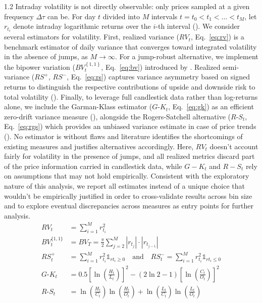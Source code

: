 \documentclass[10pt]{article}
\begin{document}
\begin{setstretch}{1.2}
Intraday volatility is not directly observable: only prices sampled at a given frequency $\Delta \tau$ can be. For day $t$ divided into $M$ intervals $t=t_0<t_1<...<t_M$, let $r_{t_i}$ denote intraday logarithmic returns over the $i$-th interval (\cite{Dumitrescu2025}). We consider several estimators for volatility. First, realized variance ($RV_t$, Eq.~\ref{eq:rv}) is a benchmark estimator of daily variance that converges toward integrated volatility in the absence of jumps, as $M \rightarrow \infty$. For a jump-robust alternative, we implement the bipower variation ($BV_t^{\left\{ 1,1 \right\}}$, Eq.~\ref{eq:bv}) introduced by \textcite{Barndorff2004}. Realized semi-variance ($RS^+$, $RS^-$, Eq.~\ref{eq:rs}) captures variance asymmetry based on signed returns to distinguish the respective contributions of upside and downside risk to total volatility (\cite{Barndorff2010}). Finally, to leverage full candlestick data rather than log-returns alone, we include the Garman-Klass estimator ($G\text{-}K_t$, Eq.~\ref{eq:gk}) as an efficient zero-drift variance measure (\cite{Garman1980}), alongside the Rogers-Satchell alternative ($R\text{-}S_t$, Eq.~\ref{eq:rgs}) which provides an unbiased variance estimate in case of price trends (\cite{Rogers1991}). No estimator is without flaws and literature identifies the shortcomings of existing measures and justifies alternatives accordingly. Here, $RV_t$ doesn't account fairly for volatility in the presence of jumps, and all realized metrics discard part of the price information carried in candlestick data, while $G-K_t$ and $R-S_t$ rely on assumptions that may not hold empirically. Consistent with the exploratory nature of this analysis, we report all estimates instead of a unique choice that wouldn't be empirically justified in order to cross-validate results across bin size and to explore eventual discrepancies across measures as entry points for further analysis. 
\begin{align}
RV_t&=\sum\limits^M_{i=1}r^2_{t_i}\tag{1} \label{eq:rv} \\
BV_t^{\{ 1,1 \}}&=BV_T=\frac{\pi}{2}\sum\limits^M_{j=2}|r_{t_j}|\cdot|r_{t_{j-1}}| \tag{2} \label{eq:bv} \\
RS_t^{+}&=\sum\limits^M_{i=1}r^2_{t_i}\mathds{1}_{rt_i\geq0}\quad\text{and}\quad RS_t^{-}=\sum\limits^M_{i=1}r^2_{t_i}\mathds{1}_{rt_i\leq0} \tag{3} \label{eq:rs} \\
G\text{-}K_t &= 0.5\left[ \ln\left(\frac{H_t}{L_t}\right)\right]^2 - (2\ln 2-1)\left[\ln\left(\frac{C_t}{O_t}\right)\right]^2\tag{4} \label{eq:gk} \\
R\text{-}S_t &= \ln\left(\frac{H_t}{C_t}\right)\ln\left(\frac{H_t}{O_t}\right)+\ln\left(\frac{L_t}{C_t}\right)\ln\left(\frac{L_t}{O_t}\right) \tag{5} \label{eq:rgs}
\end{align} 


\end{setstretch}
\end{document}
